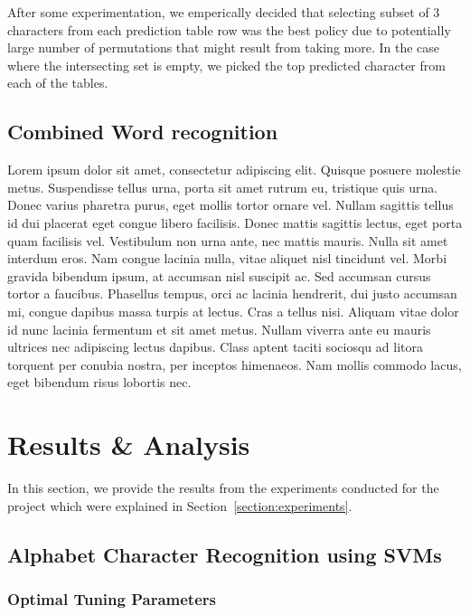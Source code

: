 \documentclass[12pt]{article}
\begin{document}
	After some experimentation, we emperically decided that selecting subset of 3 characters from each prediction table row was the best policy due to potentially large number of permutations that might result from taking more. In the case where the intersecting set is empty, we picked the top predicted character from each of the tables.
	
\subsection{Combined Word recognition}
	\label{subsection:experiments:combinedword}
	Lorem ipsum dolor sit amet, consectetur adipiscing elit. Quisque posuere molestie metus. Suspendisse tellus urna, porta sit amet rutrum eu, tristique quis urna. Donec varius pharetra purus, eget mollis tortor ornare vel. Nullam sagittis tellus id dui placerat eget congue libero facilisis. Donec mattis sagittis lectus, eget porta quam facilisis vel. Vestibulum non urna ante, nec mattis mauris. Nulla sit amet interdum eros. Nam congue lacinia nulla, vitae aliquet nisl tincidunt vel. Morbi gravida bibendum ipsum, at accumsan nisl suscipit ac. Sed accumsan cursus tortor a faucibus. Phasellus tempus, orci ac lacinia hendrerit, dui justo accumsan mi, congue dapibus massa turpis at lectus. Cras a tellus nisi. Aliquam vitae dolor id nunc lacinia fermentum et sit amet metus. Nullam viverra ante eu mauris ultrices nec adipiscing lectus dapibus. Class aptent taciti sociosqu ad litora torquent per conubia nostra, per inceptos himenaeos. Nam mollis commodo lacus, eget bibendum risus lobortis nec.

\section{Results \& Analysis}
\label{section:results}
	In this section, we provide the results from the experiments conducted for the project which were explained in Section~\ref{section:experiments}. 
	
	\subsection{Alphabet Character Recognition using SVMs}
	\label{subsubsection:analysis:svm}
	
		\subsubsection{Optimal Tuning Parameters}
		\label{subsubsection:analysis:svm:params}
	
\end{document}
